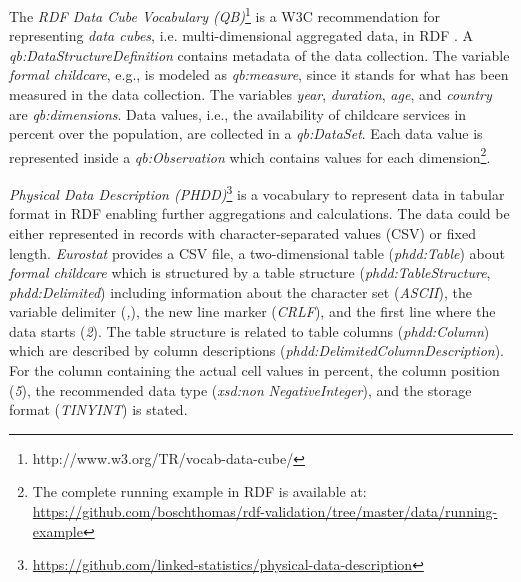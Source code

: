 \documentclass{llncs}
\newcommand{\ke}[1]{\todo[size=\small, color=red!40]{\textbf{Kai:} #1}}
\newcommand{\tb}[1]{\todo[size=\small, color=green!40]{\textbf{Thomas:} #1}}
\begin{document}
The \emph{RDF Data Cube Vocabulary (QB)}\footnote{http://www.w3.org/TR/vocab-data-cube/} is a W3C recommendation for representing \emph{data cubes}, i.e. multi-dimensional aggregated data, in RDF \cite{Cyganiak2010}. 
A \emph{qb:DataStructureDefinition} contains metadata of the data collection.
The variable \emph{formal childcare}, e.g., is modeled as \emph{qb:measure}, since it stands for what has been measured in the data collection.
The variables \emph{year}, \emph{duration}, \emph{age}, and \emph{country} are \emph{qb:dimensions}.
Data values, i.e., the availability of childcare services in percent over the population, are collected in a \emph{qb:DataSet}. 
Each data value is represented inside a \emph{qb:Observation} which contains values for each dimension\footnote{The complete running example in RDF is available at: \url{https://github.com/boschthomas/rdf-validation/tree/master/data/running-example}}. 

\emph{Physical Data Description (PHDD)}\footnote{\url{https://github.com/linked-statistics/physical-data-description}} is a vocabulary to represent data in tabular format in RDF enabling further aggregations and calculations. 
The data could be either represented in records with character-separated values (CSV) or fixed length. 
\emph{Eurostat} provides a CSV file, a two-dimensional table (\emph{phdd:Table}) about \emph{formal childcare} 
which is structured by a table structure (\emph{phdd:TableStructure}, \emph{phdd:Delimited})
including information about the character set (\emph{ASCII}), the variable delimiter (\emph{,}), the new line marker (\emph{CRLF}), and the first line where the data starts (\emph{2}).
The table structure is related to table columns (\emph{phdd:Column}) which are described by column descriptions (\emph{phdd:DelimitedColumnDescription}).
For the column containing the actual cell values in percent, the column position (\emph{5}), the recommended data type (\emph{xsd:non} \emph{NegativeInteger}), and the storage format (\emph{TINYINT}) is stated. 
\end{document}
